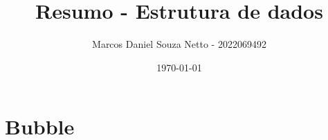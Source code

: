 \documentclass{article}
\title{Resumo - Estrutura de dados}
\author{Marcos Daniel Souza Netto - 2022069492}
\date{\today}
\begin{document}
\maketitle

\section*{Bubble}
\end{document}

